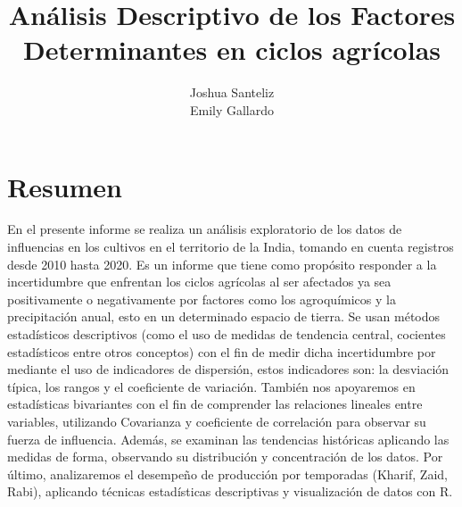 \documentclass[oneside,11pt]{Latex/Classes/PhDthesisPSnPDF}
\title{Análisis Descriptivo de los Factores Determinantes en ciclos
agrícolas}
\author{Joshua Santeliz \\ Emily Gallardo}
\begin{document}
\maketitle

\frontmatter


\setcounter{secnumdepth}{3}
\setcounter{tocdepth}{3}

\tableofcontents



\cleardoublepage

  \cleardoublepage       %
  \chapter*{Resumen}     %
  
  En el presente informe se realiza un análisis exploratorio de los
datos de influencias en los cultivos en el territorio de la India,
tomando en cuenta registros desde 2010 hasta 2020. Es un informe que
tiene como propósito responder a la incertidumbre que enfrentan los
ciclos agrícolas al ser afectados ya sea positivamente o negativamente
por factores como los agroquímicos y la precipitación anual, esto en un
determinado espacio de tierra. Se usan métodos estadísticos descriptivos
(como el uso de medidas de tendencia central, cocientes estadísticos
entre otros conceptos) con el fin de medir dicha incertidumbre por
mediante el uso de indicadores de dispersión, estos indicadores son: la
desviación típica, los rangos y el coeficiente de variación. También nos
apoyaremos en estadísticas bivariantes con el fin de comprender las
relaciones lineales entre variables, utilizando Covarianza y coeficiente
de correlación para observar su fuerza de influencia. Además, se
examinan las tendencias históricas aplicando las medidas de forma,
observando su distribución y concentración de los datos. Por último,
analizaremos el desempeño de producción por temporadas (Kharif, Zaid,
Rabi), aplicando técnicas estadísticas descriptivas y visualización de
datos con
R.             %
  
\end{document}
